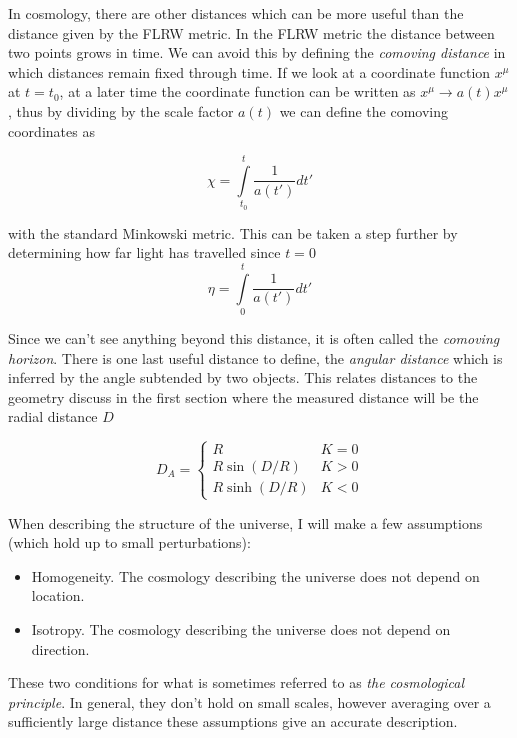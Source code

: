 In cosmology, there are other distances which can be more useful than the distance given by the FLRW metric. 
In the FLRW metric the distance between two points grows in time. 
We can avoid this by defining the \textit{comoving distance} in which distances remain fixed through time. 
If we look at a coordinate function $x^\mu$ at $t=t_0$, at a later time the coordinate function can be written as $x^\mu \rightarrow a(t) x^\mu$, thus by dividing by the scale factor $a(t)$ we can define the comoving coordinates as

\begin{equation}
    \chi = \int\limits^{t}_{t_0} \frac{1}{a(t')} dt'
\end{equation}

with the standard Minkowski metric. This can be taken a step further by determining how far light has travelled since $t=0$
\begin{equation}
    \eta = \int\limits^t_0 \frac{1}{a(t')}dt'
\end{equation}

Since we can't see anything beyond this distance, it is often called the \textit{comoving horizon}. 
There is one last useful distance to define, the \textit{angular distance} which is inferred by the angle subtended by two objects. 
This relates distances to the geometry discuss in the first section where the measured distance will be the radial distance $D$

\begin{equation}
    D_A = \left\{ \begin{array}{cc}
	    R & K=0 \\
	    R\sin(D/R) & K>0 \\
	    R\sinh(D/R) & K<0
    \end{array}
    \right.
\end{equation}

When describing the structure of the universe, I will make a few assumptions (which hold up to small perturbations):

\begin{itemize}
    \item Homogeneity. The cosmology describing the universe does not depend on location.
    \item Isotropy. The cosmology describing the universe does not depend on direction.
\end{itemize}

These two conditions for what is sometimes referred to as \textit{the cosmological principle}. 
In general, they don't hold on small scales, however averaging over a sufficiently large distance these assumptions give an accurate description. 

